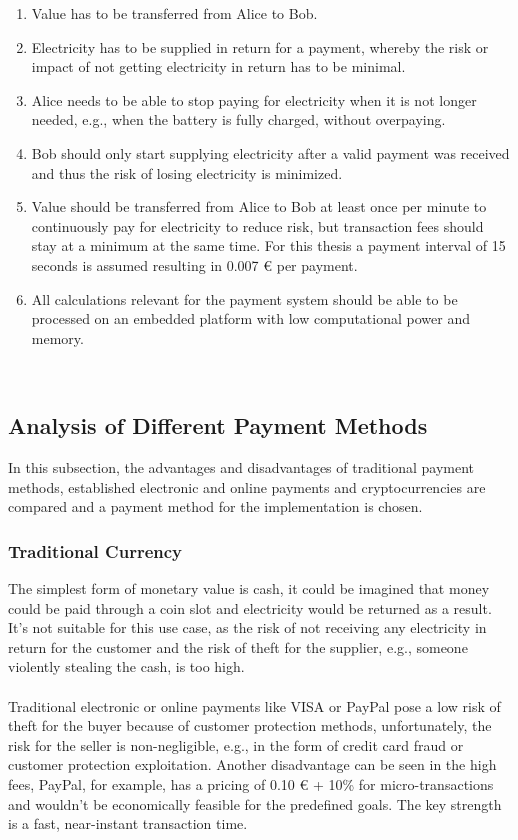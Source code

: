 \begin{enumerate}
    \item Value has to be transferred from Alice to Bob.
    \item Electricity has to be supplied in return for a payment, whereby the risk or impact of not getting electricity in return has to be minimal.
    \item Alice needs to be able to stop paying for electricity when it is not longer needed, e.g., when the battery is fully charged, without overpaying.
    \item Bob should only start supplying electricity after a valid payment was received and thus the risk of losing electricity is minimized.
    \item Value should be transferred from Alice to Bob at least once per minute to continuously pay for electricity to reduce risk, but transaction fees should stay at a minimum at the same time.
    For this thesis a payment interval of 15 seconds is assumed resulting in 0.007 \euro{} per payment.
    \item All calculations relevant for the payment system should be able to be processed on an embedded platform with low computational power and memory.
\end{enumerate}
\leavevmode
\\
\subsection{Analysis of Different Payment Methods}
In this subsection, the advantages and disadvantages of traditional payment methods, established electronic and online payments and cryptocurrencies are compared and a payment method for the implementation is chosen.
\\
\subsubsection{Traditional Currency}
The simplest form of monetary value is cash, it could be imagined that money could be paid through a coin slot and electricity would be returned as a result.
It's not suitable for this use case, as the risk of not receiving any electricity in return for the customer and the risk of theft for the supplier, e.g., someone violently stealing the cash, is too high.
\\\\
Traditional electronic or online payments like VISA or PayPal pose a low risk of theft for the buyer because of customer protection methods, unfortunately, the risk for the seller is non-negligible, e.g., in the form of credit card fraud or customer protection exploitation.
Another disadvantage can be seen in the high fees, PayPal, for example, has a pricing of 0.10 \euro{} + 10\% for micro-transactions\cite{paypal-fees} and wouldn't be economically feasible for the predefined goals.
The key strength is a fast, near-instant transaction time.
\\
